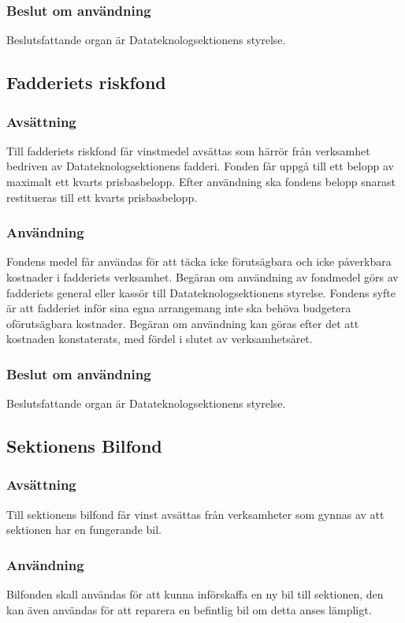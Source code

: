 \documentclass{datateknologsektionen-document}
\begin{document}
\subsubsection{Beslut om användning}
Beslutsfattande organ är Datateknologsektionens styrelse.


\subsection{Fadderiets riskfond}
\subsubsection{Avsättning}
Till fadderiets riskfond får vinstmedel avsättas som härrör från verksamhet bedriven av
Datateknologsektionens fadderi. Fonden får uppgå till ett belopp av maximalt ett kvarts
prisbasbelopp. Efter användning ska fondens belopp snarast restitueras till ett kvarts
prisbasbelopp.
\subsubsection{Användning}
Fondens medel får användas för att täcka icke förutsägbara och icke påverkbara kostnader i
fadderiets verksamhet. Begäran om användning av fondmedel görs av fadderiets general eller
kassör till Datateknologsektionens styrelse. Fondens syfte är att fadderiet inför sina egna
arrangemang inte ska behöva budgetera oförutsägbara kostnader. Begäran om användning kan
göras efter det att kostnaden konstaterats, med fördel i slutet av verksamhetsåret.
\subsubsection{Beslut om användning}
Beslutsfattande organ är Datateknologsektionens styrelse.
\subsection{Sektionens Bilfond}
\subsubsection{Avsättning}
Till sektionens bilfond får vinst avsättas från verksamheter som gynnas av att sektionen har en
fungerande bil.
\subsubsection{Användning}
Bilfonden skall användas för att kunna införskaffa en ny bil till sektionen, den kan även
användas för att reparera en befintlig bil om detta anses lämpligt.
\end{document}
